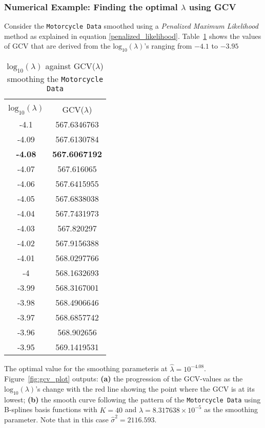 \subsubsection*{Numerical Example: Finding the optimal $\lambda$ using GCV}
Consider the \texttt{Motorcycle Data} smoothed using a \textit{Penalized Maximum Likelihood} method as explained in equation \eqref{penalized_likelihood}. Table~\ref{table:gcv_penls} shows the values of GCV that are derived from the $\text{log}_{10} (\lambda)$'s ranging from $-4.1$ to $-3.95$ 
\begin{table}[ht]
\caption[Minimizing the GCV yielding the optimal $\hat{\lambda}$ using \textit{Penalized Maximum Likelihood} method]{$\text{log}_{10} (\lambda)$ against GCV($\lambda$) smoothing the \texttt{Motorcycle Data}} 
\centering %
\begin{tabular}{c c } %
\hline\hline %
&\\[-2ex]
$\text{log}_{10} (\lambda)$ & GCV($\lambda$) \\ [0.5ex] %
\hline\hline 
-4.1	&	567.6346763	\\
-4.09	&	567.6130784	\\
\textbf{-4.08}	&	\textbf{567.6067192}	\\
-4.07	&	567.616065	\\
-4.06	&	567.6415955	\\
-4.05	&	567.6838038	\\
-4.04	&	567.7431973	\\
-4.03	&	567.820297	\\
-4.02	&	567.9156388	\\
-4.01	&	568.0297766	\\
-4	&	568.1632693	\\
-3.99	&	568.3167001	\\
-3.98	&	568.4906646	\\
-3.97	&	568.6857742	\\
-3.96	&	568.902656	\\
-3.95	&	569.1419531	\\
 [0.25ex] %
\hline %
\end{tabular}
\label{table:gcv_penls} %
\end{table}
The optimal value for the smoothing parameteris at $\hat{\lambda} = 10^{-4.08}$. Figure~\ref{fig:gcv_plot} outputs: \textbf{(a)} the progression of the GCV-values as the $\text{log}_{10} (\lambda)$'s change with the red line showing the point where the GCV is at its lowest; \textbf{(b)} the smooth curve following the pattern of the \texttt{Motorcycle Data} using B-splines basis functions with $K = 40$ and $\hat{\lambda} = 8.317638 \times 10^{-5}$ as the smoothing parameter. Note that in this case $\hat{\sigma}^2 = 2116.593$.
